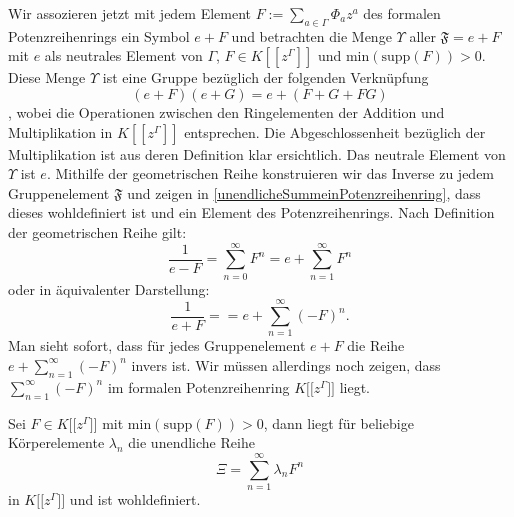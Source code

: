Wir assozieren jetzt mit jedem Element $F := \sum_{a \in \Gamma} \Phi_a z^a$ des formalen Potenzreihenrings ein Symbol $e+ F$ und betrachten die Menge $\Upsilon$ aller $\mathfrak{F} = e + F$ mit $e$ als neutrales Element von $\Gamma$, $F \in K[[z^\Gamma]]$ und $\text{min}\left(\text{supp}\left(F\right)\right) > 0$. Diese Menge $\Upsilon$ ist eine Gruppe bezüglich der folgenden Verknüpfung \[\left(e+F\right)\left(e+G\right) = e + \left(F+G+FG\right)\]
, wobei die Operationen zwischen den Ringelementen der Addition und Multiplikation in $K[[z^\Gamma]]$ entsprechen. Die Abgeschlossenheit bezüglich der Multiplikation ist aus deren Definition klar ersichtlich. Das neutrale Element von $\Upsilon$ ist $e$. Mithilfe der geometrischen Reihe konstruieren wir das Inverse zu jedem Gruppenelement $\mathfrak{F}$ und zeigen in \ref{unendlicheSummeinPotenzreihenring}, dass dieses wohldefiniert ist und ein Element des Potenzreihenrings. Nach Definition der geometrischen Reihe gilt:
\[\frac{1}{e - F} = \sum_{n=0}^{\infty}F^n = e + \sum_{n=1}^{\infty}F^n\] oder in äquivalenter Darstellung:
\[\frac{1}{e + F} = = e + \sum_{n=1}^{\infty}(-F)^n.\]
Man sieht sofort, dass für jedes Gruppenelement $e+ F$ die Reihe $e + \sum_{n=1}^{\infty}(-F)^n$ invers ist. Wir müssen allerdings noch zeigen, dass $\sum_{n=1}^{\infty}(-F)^n$ im formalen Potenzreihenring $K\lbrack\lbrack z^\Gamma\rbrack\rbrack$ liegt.
%
%
\begin{lemma}\label{unendlicheSummeinPotenzreihenring}
Sei $F\in K\lbrack\lbrack z^\Gamma\rbrack\rbrack$ mit $\text{min}\left(\text{supp}\left(F\right)\right) > 0$, dann liegt für beliebige Körperelemente $\lambda_n$ die unendliche Reihe
\[\Xi = \sum_{n=1}^{\infty}\lambda_nF^n\] in $K\lbrack\lbrack z^\Gamma\rbrack\rbrack$ und ist wohldefiniert.
\end{lemma}
